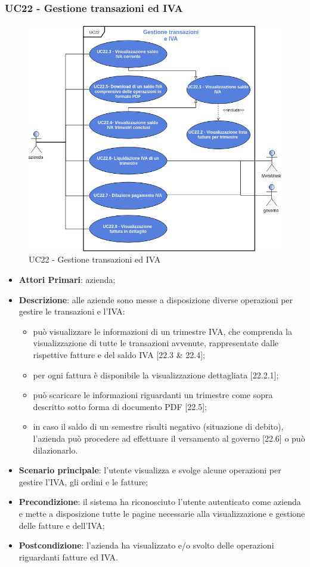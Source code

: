 \subsubsection{UC22 - Gestione transazioni ed IVA}
\begin{figure}[H]
	\includegraphics[width=12cm]{res/images/UC22.png}
	\centering
	\caption{UC22 - Gestione transazioni ed IVA}
\end{figure}
\begin{itemize}
	\item \textbf{Attori Primari}: azienda;
	\item \textbf{Descrizione}: alle aziende sono messe a disposizione diverse operazioni per gestire le transazioni e l'IVA:
	\begin{itemize}
		\item può visualizzare le informazioni di un trimestre IVA, che comprenda la visualizzazione di tutte le transazioni avvenute, rappresentate dalle rispettive fatture e del saldo IVA [22.3 \& 22.4];
		\item per ogni fattura è disponibile la visualizzazione dettagliata [22.2.1];
		\item può scaricare le informazioni riguardanti un trimestre come sopra descritto sotto forma di documento PDF [22.5]; 
		\item in caso il saldo di un semestre risulti negativo (situazione di debito), l'azienda può procedere ad effettuare il versamento al governo [22.6] o può dilazionarlo\glosp [22.7].
	\end{itemize}
	\item \textbf{Scenario principale}: l'utente visualizza e svolge alcune operazioni per gestire l'IVA, gli ordini e le fatture;
	\item \textbf{Precondizione}: il sistema ha riconosciuto l'utente autenticato come azienda e mette a disposizione tutte le pagine necessarie alla visualizzazione e gestione delle fatture e dell'IVA;
	\item \textbf{Postcondizione}: l'azienda ha visualizzato e/o svolto delle operazioni riguardanti fatture ed IVA.
\end{itemize} 
